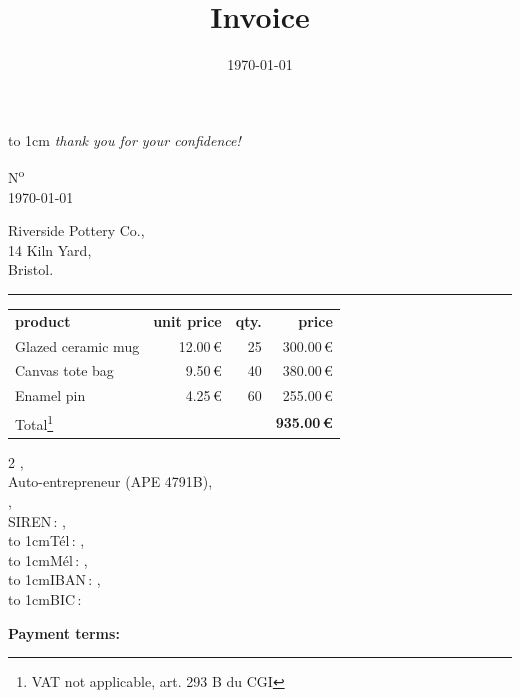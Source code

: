 \documentclass[a4paper]{article}
\title{Invoice}
\date{\today }
\makeatletter
\let\displayFont\relax
\let\thetitle\@title
\def\footnotestyle#1{%
  {\textsf{\color{footnotegray}\fontsize{3mm}{0mm}\selectfont #1}}%
}
\makeatother
\begin{document}
\parbox[b][2cm][t]{\rightalignment}{{\color{gray!95}\displayFont\fontsize{1.5cm}{1.5cm}\selectfont %
\vbox to 1cm{\vss %
%
\companyname{}%
%
}}
\vskip 3mm%
{\fontsize{0.44cm}{0.5cm}%
\emph{thank you for your confidence!}%
}
}%
%
\parbox[b][2cm][t]{0.35\textwidth}{}

\kern -5mm

\leavevmode\kern \rightalignment \parbox{0.35\textwidth}{\ttfamily N\textsuperscript{o} \invoicenum\\
\today }

\vskip 0.7cm

\leavevmode\kern \rightalignment\kern -3mm \colorbox{gray!85}{
  \kern 1mm\begin{minipage}[t]{0.5\textwidth}
    \color{white}
    \vskip 2mm
    Riverside Pottery Co.,\\
    14 Kiln Yard,\\
    Bristol.\\
    \vspace*{-3mm}%
  \end{minipage}
}

\vskip 2.3cm

\begin{center}
{\ttfamily\LARGE \thetitle}

\rule{2cm}{0.25pt}
\end{center}

\renewcommand{\arraystretch}{1.4}
\begin{longtable}{@{}p{}rrr@{}}
    \rowcolor{headcolor}
    \textbf{product} & \textbf{unit price} & \textbf{qty.} & \textbf{price} \\
    \rowcolor{tablecolor1}
    Glazed ceramic mug & 12.00\,€ & 25 & 300.00\,€\\
    \rowcolor{tablecolor2}
    Canvas tote bag & 9.50\,€ & 40 & 380.00\,€\\
    \rowcolor{tablecolor1}
    Enamel pin & 4.25\,€ & 60 & 255.00\,€\\
    \rowcolor{headcolor}
    Total\footnote{\footnotestyle{VAT not applicable, art. 293 B du CGI}} & & & \textbf{935.00\,€}\\
\end{longtable}

\vfill

\small

\setlength{\columnsep}{1.5cm}
\begin{multicols}{2}
\noindent\companyname{},\\
Auto-entrepreneur {\small (APE 4791B)},\\
\companyaddress{},\\
SIREN\,: \companysiren{},\\
\hbox to 1cm{Tél\,:\hss} \companytel,\\
\hbox to 1cm{Mél\,:\hss} \companyemail,\\
\hbox to 1cm{IBAN\,:\hss} \bankiban,\\
\hbox to 1cm{BIC\,:\hss} \bankbic
\end{multicols}

\footnotestyle{\textbf{Payment terms:} \conditions }
\end{document}
